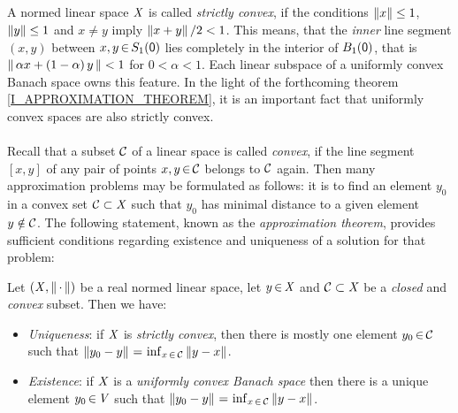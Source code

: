 \documentclass[11pt,twoside]{article}
\begin{document}
\subparagraph{} %
A normed linear space $\mathit{X}$ is called \textit{strictly convex},
if the conditions
$\left\lVert x \right\rVert \leq 1$, $\left\lVert y \right\rVert \leq 1$ and $x \neq y$
imply
$\left\lVert x+y \right\rVert/2< 1$.
This means,
that the \textit{inner} line segment $(x,y)$
between $x,y {\,\in\,} S_1({\mathsf{0}})$ lies completely in the interior of $B_1({\mathsf{0}})$,
that is
$\left\lVert \,\alpha x + (1-\alpha)\,y\, \right\rVert < 1$ for $0 < \alpha < 1$.
Each linear subspace of a uniformly convex Banach space owns this feature.
In the light of the forthcoming theorem \ref{I_APPROXIMATION_THEOREM},
it is an important fact
that uniformly convex spaces are also strictly convex.

\paragraph{} %
Recall that a subset $\mathcal{C}$ of a linear space is called \textit{convex},
if the line segment $[x,y]$ of any pair of points $x,y {\,\in\,} \mathcal{C}$
belongs to $\mathcal{C}$ again.
Then many approximation problems may be formulated as follows:
it is to find an element $y_0$ in a convex set $\mathcal{C} \subset \mathit{X}$
such that $y_0$ has minimal distance to a given element $y \notin \mathcal{C}$.
The following statement,
known as the \textit{approximation theorem},
provides sufficient conditions regarding existence and uniqueness
of a solution for that problem:

\begin{theorem1}\label{I_APPROXIMATION_THEOREM}
Let $(\mathit{X},\left\lVert \,\cdot\, \right\rVert)$ be a real normed linear space,
let $y {\,\in\,} \mathit{X}$ and
$\mathcal{C} \subset \mathit{X}$ be a \textit{closed} and \textit{convex} subset.
Then we have:

\begin{itemize}[leftmargin=17pt,itemsep=5pt]
\item[(a)] \textit{Uniqueness}:
if $\mathit{X}$ is \textit{strictly convex},
then there is mostly one element $y_0 {\,\in\,} \mathcal{C}$
such that $\left\lVert y_0-y \right\rVert {\,=\,} \inf_{x {\,\in\,} \mathcal{C}} \left\lVert y-x \right\rVert$.

\item[(b)] \textit{Existence}:
if $\mathit{X}$ is a \textit{uniformly convex Banach space}
then there is a unique element $y_0 {\,\in\,} \mathit{V}$
such that $\left\lVert y_0-y \right\rVert {\,=\,} \inf_{x {\,\in\,} \mathcal{C}} \left\lVert y-x \right\rVert$.
\end{itemize}
\end{theorem1}
\end{document}
